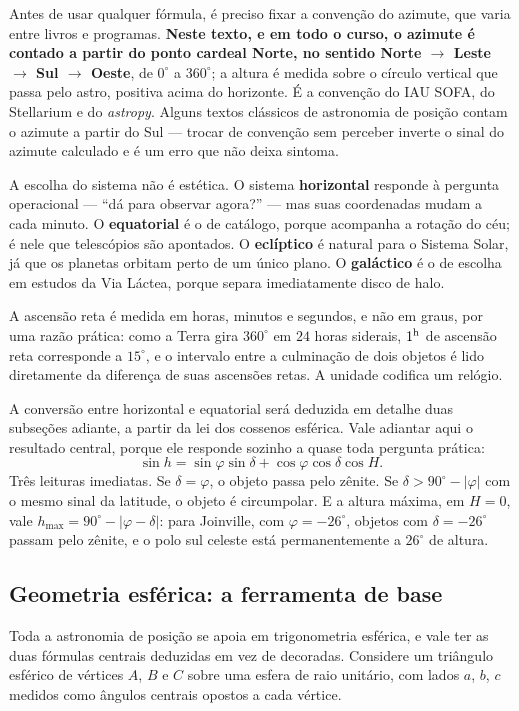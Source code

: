 \documentclass[11pt,a4paper]{article}
\begin{document}
Antes de usar qualquer fórmula, é preciso fixar a convenção do azimute, que varia entre livros e programas. \textbf{Neste texto, e em todo o curso, o azimute é contado a partir do ponto cardeal Norte, no sentido Norte $\to$ Leste $\to$ Sul $\to$ Oeste}, de $0^\circ$ a $360^\circ$; a altura é medida sobre o círculo vertical que passa pelo astro, positiva acima do horizonte. É a convenção do IAU SOFA, do Stellarium e do \textit{astropy}. Alguns textos clássicos de astronomia de posição contam o azimute a partir do Sul --- trocar de convenção sem perceber inverte o sinal do azimute calculado e é um erro que não deixa sintoma.

A escolha do sistema não é estética. O sistema \textbf{horizontal} responde à pergunta operacional --- ``dá para observar agora?'' --- mas suas coordenadas mudam a cada minuto. O \textbf{equatorial} é o de catálogo, porque acompanha a rotação do céu; é nele que telescópios são apontados. O \textbf{eclíptico} é natural para o Sistema Solar, já que os planetas orbitam perto de um único plano. O \textbf{galáctico} é o de escolha em estudos da Via Láctea, porque separa imediatamente disco de halo.

A ascensão reta é medida em horas, minutos e segundos, e não em graus, por uma razão prática: como a Terra gira $360^\circ$ em $24$ horas siderais, $1^{\rm h}$ de ascensão reta corresponde a $15^\circ$, e o intervalo entre a culminação de dois objetos é lido diretamente da diferença de suas ascensões retas. A unidade codifica um relógio.

A conversão entre horizontal e equatorial será deduzida em detalhe duas subseções adiante, a partir da lei dos cossenos esférica. Vale adiantar aqui o resultado central, porque ele responde sozinho a quase toda pergunta prática:
\[
\sin h=\sin\varphi\sin\delta+\cos\varphi\cos\delta\cos H.
\]
Três leituras imediatas. Se $\delta=\varphi$, o objeto passa pelo zênite. Se $\delta>90^\circ-|\varphi|$ com o mesmo sinal da latitude, o objeto é circumpolar. E a altura máxima, em $H=0$, vale $h_{\max}=90^\circ-|\varphi-\delta|$: para Joinville, com $\varphi=-26^\circ$, objetos com $\delta=-26^\circ$ passam pelo zênite, e o polo sul celeste está permanentemente a $26^\circ$ de altura.

\subsection*{Geometria esférica: a ferramenta de base}

Toda a astronomia de posição se apoia em trigonometria esférica, e vale ter as duas fórmulas centrais deduzidas em vez de decoradas. Considere um triângulo esférico de vértices $A$, $B$ e $C$ sobre uma esfera de raio unitário, com lados $a$, $b$, $c$ medidos como ângulos centrais opostos a cada vértice.
\end{document}
